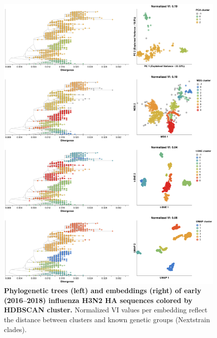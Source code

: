 \documentclass[10pt,letterpaper]{article}
\begin{document}
\begin{figure}[!h]
\includegraphics[width=\columnwidth]{figures/flu-2016-2018-ha-embeddings-by-cluster.png}
\caption{{\bf Phylogenetic trees (left) and embeddings (right) of early (2016--2018) influenza H3N2 HA sequences colored by HDBSCAN cluster.}
Normalized VI values per embedding reflect the distance between clusters and known genetic groups (Nextstrain clades).}
\label{fig:seasonal-influenza-h3n2-ha-2016-2018-clusters}
\end{figure}
\end{document}
